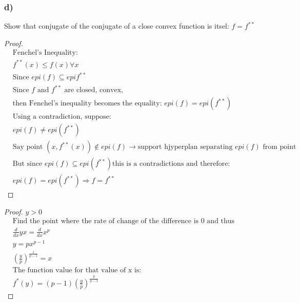 \documentclass[12pt]{article}
\begin{document}
\subsubsection*{d)}
Show that conjugate of the conjugate of a close convex function is itsel: $f = f^{**}$
\begin{proof}{}
\begin{align*}
& \text{Fenchel's Inequality:}\\
& f^{**}(x) \le f(x) \forall x\\
& \text{Since } epi(f) \subseteq epif^{**}\\
& \text{Since $f$ and $f^{**}$ are closed, convex,}\\
& \text{then Fenchel's inequality becomes the equality: } epi(f) = epi(f^{**})\\
& \text{Using a contradiction, suppose: }\\
& epi(f) \not= epi(f^{**})\\
& \text{Say point } (x, f^{**}(x)) \not\in epi(f) \rightarrow \text{support hjyperplan separating $epi(f)$ from point}\\
& \text{But since } epi(f) \subseteq epi(f^{**}) \text{this is a contradictions and therefore: }\\
& epi(f) = epi(f^{**}) \Rightarrow f = f^{**}
\end{align*}
\end{proof}

\begin{proof}{$y > 0$}
\begin{align*}
& \text{Find the point where the rate of change of the difference is 0 and thus bounded:}\\
& \frac{d}{dx}yx = \frac{d}{dx}x^p\\
& y = px^{p-1}\\
& (\frac{y}{p})^{\frac{1}{p-1}} = x\\
& \text{The function value for that value of x is: }\\
& f^*(y) = (p-1)(\frac{y}{p})^{\frac{p}{p-1}}
\end{align*}
\end{proof}
 
\end{document}
